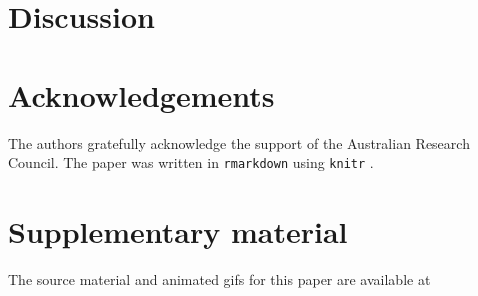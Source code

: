 \documentclass[]{interact}
\theoremstyle{plain}%
\theoremstyle{definition}
\theoremstyle{remark}
\begin{document}
\hypertarget{sec:discussion}{%
\section{Discussion}\label{sec:discussion}}

\hypertarget{acknowledgements}{%
\section*{Acknowledgements}\label{acknowledgements}}

The authors gratefully acknowledge the support of the Australian
Research Council. The paper was written in \texttt{rmarkdown}
\citep{rmarkdown} using \texttt{knitr} \citep{knitr}.

\hypertarget{supplementary-material}{%
\section*{Supplementary material}\label{supplementary-material}}

The source material and animated gifs for this paper are available at



\end{document}
